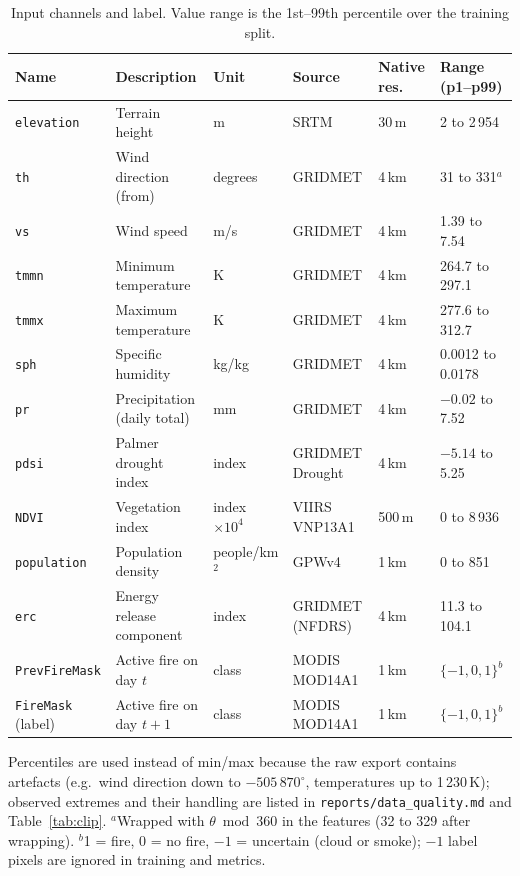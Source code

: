 \begin{table}[t]
\centering
\caption{Input channels and label. Value range is the 1st--99th percentile over the training split.}
\label{tab:datadict}
\small
\setlength{\tabcolsep}{4pt}
\begin{tabular}{llllll}
\hline
Name & Description & Unit & Source & Native res. & Range (p1--p99) \\
\hline
\texttt{elevation} & Terrain height & m & SRTM & 30\,m & 2 to 2\,954 \\
\texttt{th} & Wind direction (from) & degrees & GRIDMET & 4\,km & 31 to 331$^{a}$ \\
\texttt{vs} & Wind speed & m/s & GRIDMET & 4\,km & 1.39 to 7.54 \\
\texttt{tmmn} & Minimum temperature & K & GRIDMET & 4\,km & 264.7 to 297.1 \\
\texttt{tmmx} & Maximum temperature & K & GRIDMET & 4\,km & 277.6 to 312.7 \\
\texttt{sph} & Specific humidity & kg/kg & GRIDMET & 4\,km & 0.0012 to 0.0178 \\
\texttt{pr} & Precipitation (daily total) & mm & GRIDMET & 4\,km & $-0.02$ to 7.52 \\
\texttt{pdsi} & Palmer drought index & index & GRIDMET Drought & 4\,km & $-5.14$ to 5.25 \\
\texttt{NDVI} & Vegetation index & index $\times 10^4$ & VIIRS VNP13A1 & 500\,m & 0 to 8\,936 \\
\texttt{population} & Population density & people/km$^2$ & GPWv4 & 1\,km & 0 to 851 \\
\texttt{erc} & Energy release component & index & GRIDMET (NFDRS) & 4\,km & 11.3 to 104.1 \\
\texttt{PrevFireMask} & Active fire on day $t$ & class & MODIS MOD14A1 & 1\,km & $\{-1, 0, 1\}^{b}$ \\
\hline
\texttt{FireMask} (label) & Active fire on day $t{+}1$ & class & MODIS MOD14A1 & 1\,km & $\{-1, 0, 1\}^{b}$ \\
\hline
\end{tabular}

\vspace{2pt}
\begin{minipage}{0.92\textwidth}
\footnotesize
Percentiles are used instead of min/max because the raw export contains artefacts (e.g.\ wind
direction down to $-505\,870^\circ$, temperatures up to 1\,230\,K); observed extremes and their
handling are listed in \texttt{reports/data\_quality.md} and Table~\ref{tab:clip}.
$^{a}$Wrapped with $\theta \bmod 360$ in the features (32 to 329 after wrapping).
$^{b}$1 = fire, 0 = no fire, $-1$ = uncertain (cloud or smoke); $-1$ label pixels are ignored in
training and metrics.
\end{minipage}
\end{table}
